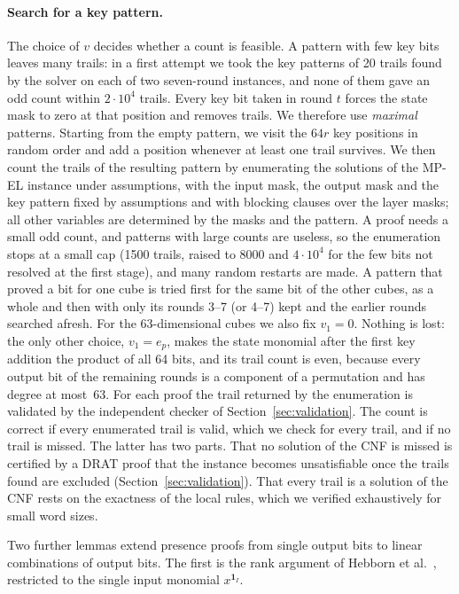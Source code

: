 \documentclass[11pt,a4paper]{article}
\theoremstyle{definition}
\theoremstyle{remark}
\newcommand{\MPEL}{\textsf{MP-EL}}
\begin{document}
\paragraph{Search for a key pattern.} The choice of $v$ decides whether a count is feasible. A pattern with few key bits leaves many trails: in a first attempt we took the key patterns of 20 trails found by the solver on each of two seven-round instances, and none of them gave an odd count within $2\cdot10^4$ trails. Every key bit taken in round $t$ forces the state mask to zero at that position and removes trails. We therefore use \emph{maximal} patterns. Starting from the empty pattern, we visit the $64r$ key positions in random order and add a position whenever at least one trail survives. We then count the trails of the resulting pattern by enumerating the solutions of the \MPEL{} instance under assumptions, with the input mask, the output mask and the key pattern fixed by assumptions and with blocking clauses over the layer masks; all other variables are determined by the masks and the pattern. A proof needs a small odd count, and patterns with large counts are useless, so the enumeration stops at a small cap (1500 trails, raised to 8000 and $4\cdot10^4$ for the few bits not resolved at the first stage), and many random restarts are made. A pattern that proved a bit for one cube is tried first for the same bit of the other cubes, as a whole and then with only its rounds 3--7 (or 4--7) kept and the earlier rounds searched afresh. For the 63-dimensional cubes we also fix $v_1=0$. Nothing is lost: the only other choice, $v_1=e_p$, makes the state monomial after the first key addition the product of all 64 bits, and its trail count is even, because every output bit of the remaining rounds is a component of a permutation and has degree at most~63. For each proof the trail returned by the enumeration is validated by the independent checker of Section~\ref{sec:validation}. The count is correct if every enumerated trail is valid, which we check for every trail, and if no trail is missed. The latter has two parts. That no solution of the CNF is missed is certified by a DRAT proof that the instance becomes unsatisfiable once the trails found are excluded (Section~\ref{sec:validation}). That every trail is a solution of the CNF rests on the exactness of the local rules, which we verified exhaustively for small word sizes.

Two further lemmas extend presence proofs from single output bits to linear combinations of output bits. The first is the rank argument of Hebborn et al.~\cite{hebborn2021}, restricted to the single input monomial $x^{\mathbf 1_I}$.
\end{document}
